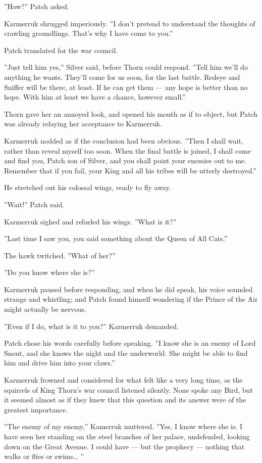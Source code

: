 \documentclass[12pt]{book}
\begin{document}
''How?'' Patch asked.

Karmerruk shrugged imperiously. ''I don't pretend to understand the thoughts of crawling groundlings. That's why I have come to you.''

Patch translated for the war council.

''Just tell him yes,'' Silver said, before Thorn could respond. ''Tell him we'll do anything he wants. They'll come for us soon, for the last battle. Redeye and Sniffer will be there, at least. If he can get them ---
any hope is better than no hope. With him at least we have a chance, however small.''

Thorn gave her an annoyed look, and opened his mouth as if to object, but Patch was already relaying her acceptance to Karmerruk.

Karmerruk nodded as if the conclusion had been obvious. ''Then I shall wait, rather than reveal myself too soon. When the final battle is joined, I shall come and find you, Patch son of Silver, and you shall point your enemies out to me. Remember that if you fail, your King and all his tribes will be utterly destroyed.''

He stretched out his colossal wings, ready to fly away.

''Wait!'' Patch said.

Karmerruk sighed and refurled his wings. ''What is it?''

''Last time I saw you, you said something about the Queen of All Cats.''

The hawk twitched. ''What of her?''

''Do you know where she is?''

Karmerruk paused before responding, and when he did speak, his voice sounded strange and whistling; and Patch found himself wondering if the Prince of the Air might actually be nervous.

''Even if I do, what is it to you?'' Karmerruk demanded.

Patch chose his words carefully before speaking. ''I know she is an enemy of Lord Snout, and she knows the night and the underworld. She might be able to find him and drive him into your claws.''

Karmerruk frowned and considered for what felt like a very long time, as the squirrels of King Thorn's war council listened silently. None spoke any Bird, but it seemed almost as if they knew that this question and its answer were of the greatest importance.

''The enemy of my enemy,'' Kamerruk muttered. ''Yes, I know where she is. I have seen her standing on the steel branches of her palace, undefended, looking down on the Great Avenue. I could have ---
but the prophecy ---
nothing that walks or flies or swims\ldots{}
''
\end{document}
